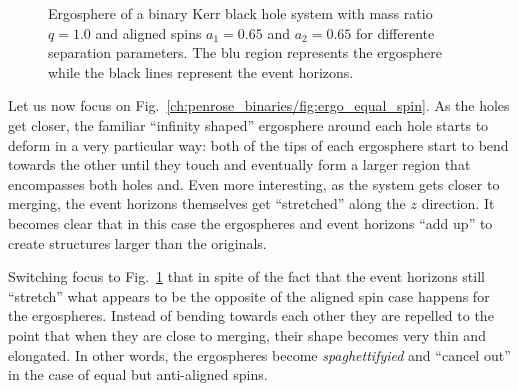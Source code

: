 \begin{figure}
{    \label{ch:penrose_binaries/fig:ergo_unequal_c}
  }
  \caption{Ergosphere of a binary Kerr black hole system with mass ratio $q=1.0$ and aligned spins $a_1=0.65$ and $a_2=0.65$ for differente separation parameters. The blu region represents the ergosphere while the black lines represent the event horizons.}
  \label{ch:penrose_binaries/fig:ergo_unequal_spin}
\end{figure}

Let us now focus on Fig.~\ref{ch:penrose_binaries/fig:ergo_equal_spin}. As the holes get closer, the familiar ``infinity shaped'' ergosphere around each hole starts to deform in a very particular way: both of the tips of each ergosphere start to bend towards the other until they touch and eventually form a larger region that encompasses both holes and. Even more interesting, as the system gets closer to merging, the event horizons themselves get ``stretched'' along the $z$ direction. It becomes clear that in this case the ergospheres and event horizons ``add up'' to create structures larger than the originals.

Switching focus to Fig.~\ref{ch:penrose_binaries/fig:ergo_unequal_spin} that in spite of the fact that the event horizons still ``stretch'' what appears to be the opposite of the aligned spin case happens for the ergospheres. Instead of bending towards each other they are repelled to the point that when they are close to merging, their shape becomes very thin and elongated. In other words, the ergospheres become \textit{spaghettifyied} and ``cancel out'' in the case of equal but anti-aligned spins.

